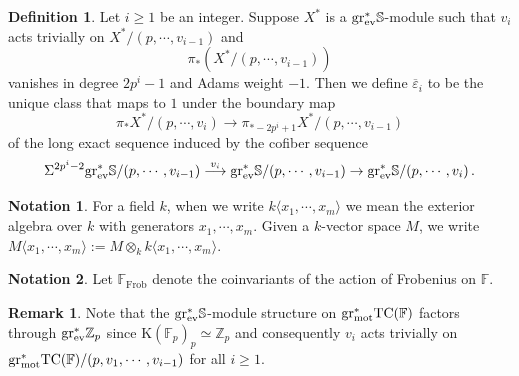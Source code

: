 \documentclass[english,10pt]{amsart}
\newcommand{\field}{\mathbb{F}}
\theoremstyle{definition}
\newtheorem{defi}{Definition}[section]
\newtheorem{nota}{Notation}[section]
\newtheorem{rema}{Remark}[section]
\numberwithin{equation}{section}
\begin{document}
\begin{defi}\label{def:epsilon}
Let $i\ge 1$ be an integer. 
Suppose $X^{*}$ is a $\mathrm{gr}_{\textup{ev}}^*\mathbb{S}$-module such that $v_i$ acts trivially on $X^{*}/(p,\cdots ,v_{i-1})$ and 
\[\pi_*(X^*/(p,\cdots ,v_{i-1}))\] 
vanishes in degree $2p^{i}-1$ and Adams weight $-1$. 
Then we define $\overline{\varepsilon}_i$ to be the unique class that maps to $1$ under the boundary map 
\[ \pi_*X^{*}/(p,\cdots ,v_{i})\to \pi_{*-2p^i+1}X^{*}/(p,\cdots ,v_{i-1})\]
of the long exact sequence induced by the cofiber sequence 
\[\Sigma^{2p^i-2}\mathrm{gr}_{\textup{ev}}^*\mathbb{S}/(p,\cdots ,v_{i-1})\overset{v_i}{\longrightarrow}  \mathrm{gr}_{\textup{ev}}^*\mathbb{S}/(p,\cdots ,v_{i-1})\to  \mathrm{gr}_{\textup{ev}}^*\mathbb{S}/(p,\cdots ,v_{i}) \,.
\]
\end{defi}

\begin{nota}
For a field $k$, when we write $k\langle x_1,\cdots,x_m\rangle$ we mean the exterior algebra over $k$ with generators $x_1,\cdots,x_m$. Given a $k$-vector space $M$, we write $M\langle x_1,\cdots ,x_m\rangle:=M\otimes_{k}k\langle x_1,\cdots ,x_m\rangle$. 
\end{nota}
\begin{nota}
Let $\field_{\mathrm{Frob}}$ denote the coinvariants of the action of Frobenius on $\field$. 
\end{nota}
\begin{rema}\label{Z-algebra}
Note that the $\mathrm{gr}_{\textup{ev}}^*\mathbb{S}$-module structure on $\mathrm{gr}_{\textup{mot}}^*\mathrm{TC}(\field)$ factors through  $\mathrm{gr}_{\textup{ev}}^*\mathbb{Z}_p$ since $\mathrm{K}(\mathbb{F}_p)_p\simeq \mathbb{Z}_p$ and consequently $v_i$ acts trivially on  $\mathrm{gr}_{\textup{mot}}^*\mathrm{TC}(\field)/(p,v_1,\cdots ,v_{i-1})$ for all $i\ge 1$. 
\end{rema}
\end{document}
